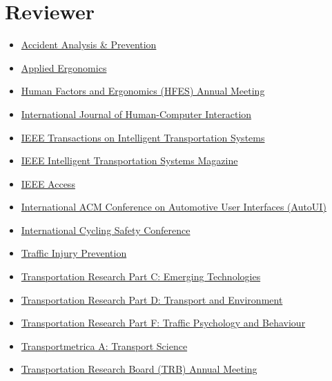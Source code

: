 \documentclass[11pt]{article}
\newenvironment{main}
{\begin{adjustwidth}{3em}{}}
{\end{adjustwidth}}
\begin{document}
\section*{Reviewer}
\begin{main}

\begin{itemize}
    \item \href{https://www.journals.elsevier.com/accident-analysis-and-prevention}{Accident Analysis \& Prevention}
    \item \href{https://www.journals.elsevier.com/applied-ergonomics}{Applied Ergonomics}
    \item \href{www.hfes.org}{Human Factors and Ergonomics (HFES) Annual Meeting}
    \item \href{https://www.tandfonline.com/toc/hihc20/current}{International Journal of Human-Computer Interaction}
    \item \href{https://ieeexplore.ieee.org/xpl/RecentIssue.jsp?punumber=6979}{IEEE Transactions on Intelligent Transportation Systems}
    \item \href{https://ieeexplore.ieee.org/xpl/RecentIssue.jsp?punumber=5117645}{IEEE Intelligent Transportation Systems Magazine}
    \item \href{https://ieeexplore.ieee.org/xpl/RecentIssue.jsp?punumber=6287639}{IEEE Access}
    \item \href{www.auto-ui.org}{International ACM Conference on Automotive User Interfaces (AutoUI)}
    \item \href{www.cyclingsafety.net}{International Cycling Safety Conference}
    \item \href{https://www.tandfonline.com/toc/gcpi20/current}{Traffic Injury Prevention}
    \item \href{https://www.journals.elsevier.com/transportation-research-part-c-emerging-technologies}{Transportation Research Part C: Emerging Technologies}
    \item \href{https://www.journals.elsevier.com/transportation-research-part-d-transport-and-environment}{Transportation Research Part D: Transport and Environment}
    \item \href{https://www.journals.elsevier.com/transportation-research-part-f-traffic-psychology-and-behaviour}{Transportation Research Part F: Traffic Psychology and Behaviour}
    \item \href{https://www.tandfonline.com/toc/ttra21/current}{Transportmetrica A: Transport Science}
    \item \href{http://www.trb.org/AnnualMeeting/}{Transportation Research Board (TRB) Annual Meeting}
\end{itemize}


\end{main}
\end{document}
